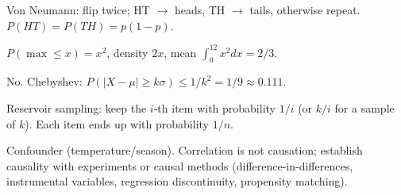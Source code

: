 \A Von Neumann: flip twice; HT $\to$ heads, TH $\to$ tails, otherwise repeat. $P(HT)=P(TH)=p(1-p)$.

\A $P(\max\le x)=x^2$, density $2x$, mean $\int_0^12x^2dx=2/3$.

\A No. Chebyshev: $P(|X-\mu|\ge k\sigma)\le1/k^2=1/9\approx0.111$.

\A Reservoir sampling: keep the $i$-th item with probability $1/i$ (or $k/i$ for a sample of $k$). Each item ends up with probability $1/n$.

\A Confounder (temperature/season). Correlation is not causation; establish causality with experiments or causal methods (difference-in-differences, instrumental variables, regression discontinuity, propensity matching).
